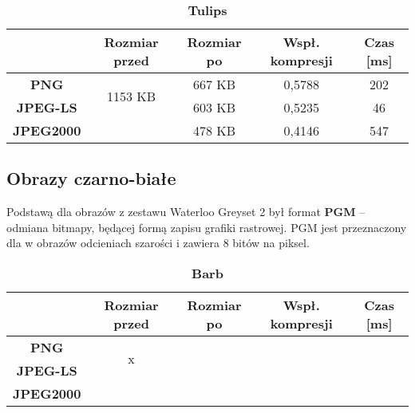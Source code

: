 \begin{table}[!h]
	\centering
	\caption{\textbf{Tulips}}
	\label{my-label}
	\begin{tabular}{|c|c|c|c|c|}                                             
		\hline
		& \textbf{Rozmiar przed} & \textbf{Rozmiar po} & \textbf{Wspł. kompresji} & \textbf{Czas {[}ms{]}} \\ \hline 
		\textbf{PNG}      &          \multicolumn{1}{c|}{\multirow{2}{*}{1153 KB}}             &        667 KB             &      0,5788                    &          202                   \\\cline{3-5}
		\textbf{JPEG-LS}  &                        &      603  KB             &       0,5235                   &          46                \\\cline{3-5}
		\textbf{JPEG2000} &                        &      478 KB               &       0,4146                   &     547                 \\ \hline
	\end{tabular}
\end{table}





\subsection{Obrazy czarno-białe}

Podstawą dla obrazów z zestawu Waterloo Greyset 2 był format \textbf{PGM} -- odmiana bitmapy, będącej formą zapisu grafiki rastrowej. PGM jest przeznaczony dla w obrazów odcieniach szarości i zawiera 8 bitów na piksel.

\begin{table}[!h]
	\centering
	\caption{\textbf{Barb}}
	\label{my-label}
	\begin{tabular}{|c|c|c|c|c|}                                             
		\hline
		& \textbf{Rozmiar przed} & \textbf{Rozmiar po} & \textbf{Wspł. kompresji} & \textbf{Czas {[}ms{]}} \\ \hline 
		\textbf{PNG}      &          \multicolumn{1}{c|}{\multirow{2}{*}{x}}             &                     &                          &                             \\\cline{3-5}
		\textbf{JPEG-LS}  &                        &                     &                          &                          \\\cline{3-5}
		\textbf{JPEG2000} &                        &                     &                          &                      \\ \hline
	\end{tabular}
\end{table}

